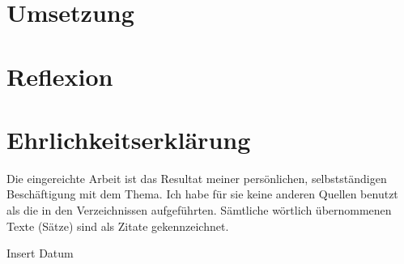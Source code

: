 \documentclass[12pt,a4paper]{report}
\begin{document}
\chapter{Umsetzung}
\label{ch:umsetzung}

\chapter{Reflexion}
\label{ch:reflexion}

%
%
%
{}

\listoffigures

\appendix

\chapter*{Ehrlichkeitserklärung}

Die eingereichte Arbeit ist das Resultat meiner persönlichen, selbstständigen Beschäftigung mit dem Thema.
Ich habe für sie keine anderen Quellen benutzt als die in den Verzeichnissen aufgeführten.
Sämtliche wörtlich übernommenen Texte (Sätze) sind als Zitate gekennzeichnet.

\vspace{2cm}
Insert Datum
\end{document}
